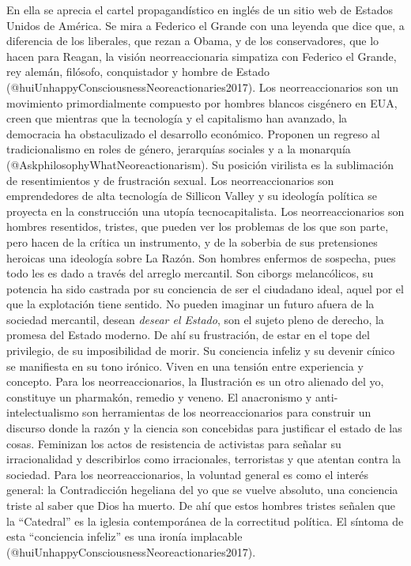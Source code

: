 \documentclass[
]{article}
\begin{document}
En ella se aprecia el cartel propagandístico en inglés de un sitio web
de Estados Unidos de América. Se mira a Federico el Grande con una
leyenda que dice que, a diferencia de los liberales, que rezan a Obama,
y de los conservadores, que lo hacen para Reagan, la visión
neorreaccionaria simpatiza con Federico el Grande, rey alemán, filósofo,
conquistador y hombre de Estado
(@huiUnhappyConsciousnessNeoreactionaries2017). Los neorreaccionarios
son un movimiento primordialmente compuesto por hombres blancos
cisgénero en EUA, creen que mientras que la tecnología y el capitalismo
han avanzado, la democracia ha obstaculizado el desarrollo económico.
Proponen un regreso al tradicionalismo en roles de género, jerarquías
sociales y a la monarquía (@AskphilosophyWhatNeoreactionarism). Su
posición virilista es la sublimación de resentimientos y de frustración
sexual. Los neorreaccionarios son emprendedores de alta tecnología de
Sillicon Valley y su ideología política se proyecta en la construcción
una utopía tecnocapitalista. Los neorreaccionarios son hombres
resentidos, tristes, que pueden ver los problemas de los que son parte,
pero hacen de la crítica un instrumento, y de la soberbia de sus
pretensiones heroicas una ideología sobre La Razón. Son hombres enfermos
de sospecha, pues todo les es dado a través del arreglo mercantil. Son
ciborgs melancólicos, su potencia ha sido castrada por su conciencia de
ser el ciudadano ideal, aquel por el que la explotación tiene sentido.
No pueden imaginar un futuro afuera de la sociedad mercantil, desean
\emph{desear el Estado}, son el sujeto pleno de derecho, la promesa del
Estado moderno. De ahí su frustración, de estar en el tope del
privilegio, de su imposibilidad de morir. Su conciencia infeliz y su
devenir cínico se manifiesta en su tono irónico. Viven en una tensión
entre experiencia y concepto. Para los neorreaccionarios, la Ilustración
es un otro alienado del yo, constituye un pharmakón, remedio y veneno.
El anacronismo y anti-intelectualismo son herramientas de los
neorreaccionarios para construir un discurso donde la razón y la ciencia
son concebidas para justificar el estado de las cosas. Feminizan los
actos de resistencia de activistas para señalar su irracionalidad y
describirlos como irracionales, terroristas y que atentan contra la
sociedad. Para los neorreaccionarios, la voluntad general es como el
interés general: la Contradicción hegeliana del yo que se vuelve
absoluto, una conciencia triste al saber que Dios ha muerto. De ahí que
estos hombres tristes señalen que la ``Catedral'' es la iglesia
contemporánea de la correctitud política. El síntoma de esta
``conciencia infeliz'' es una ironía implacable
(@huiUnhappyConsciousnessNeoreactionaries2017).
\end{document}
